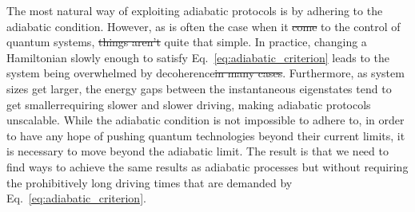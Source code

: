 \documentclass[a4paper,oneside,11pt]{book}
\newcommand{\reminder}[1]{\textcolor{blue}{Reminder: #1}}
\providecommand{\DIFaddtex}[1]{{\protect\color{blue}\uwave{#1}}} %
\providecommand{\DIFdeltex}[1]{{\protect\color{red}\sout{#1}}}                      %
\providecommand{\DIFaddbegin}{} %
\providecommand{\DIFaddend}{} %
\providecommand{\DIFdelbegin}{} %
\providecommand{\DIFdelend}{} %
\providecommand{\DIFadd}[1]{\texorpdfstring{\DIFaddtex{#1}}{#1}} %
\providecommand{\DIFdel}[1]{\texorpdfstring{\DIFdeltex{#1}}{}} %
\newcommand{\DIFscaledelfig}{0.5}
\newlength{\DIFdelgraphicswidth} %
\newlength{\DIFdelgraphicsheight} %
\newcommand{\DIFaddincludegraphics}[2][]{{\color{blue}\fbox{\DIFOincludegraphics[#1]{#2}}}} %
\newcommand{\DIFdelincludegraphics}[2][]{%
\sbox{\DIFdelgraphicsbox}{\DIFOincludegraphics[#1]{#2}}%
\settoboxwidth{\DIFdelgraphicswidth}{\DIFdelgraphicsbox} %
\settoboxtotalheight{\DIFdelgraphicsheight}{\DIFdelgraphicsbox} %
\scalebox{\DIFscaledelfig}{%
\parbox[b]{\DIFdelgraphicswidth}{\usebox{\DIFdelgraphicsbox}\\[-\baselineskip] \rule{\DIFdelgraphicswidth}{0em}}\llap{\resizebox{\DIFdelgraphicswidth}{\DIFdelgraphicsheight}{%
\setlength{\unitlength}{\DIFdelgraphicswidth}%
\begin{picture}(1,1)%
\thicklines\linethickness{2pt} %
{\color[rgb]{1,0,0}\put(0,0){\framebox(1,1){}}}%
{\color[rgb]{1,0,0}\put(0,0){\line( 1,1){1}}}%
{\color[rgb]{1,0,0}\put(0,1){\line(1,-1){1}}}%
\end{picture}%
}\hspace*{3pt}}} %
} %
\DeclareRobustCommand{\DIFaddbegin}{\DIFOaddbegin \let\includegraphics\DIFaddincludegraphics} %
\DeclareRobustCommand{\DIFaddend}{\DIFOaddend \let\includegraphics\DIFOincludegraphics} %
\DeclareRobustCommand{\DIFdelbegin}{\DIFOdelbegin \let\includegraphics\DIFdelincludegraphics} %
\DeclareRobustCommand{\DIFdelend}{\DIFOaddend \let\includegraphics\DIFOincludegraphics} %
\begin{document}
    The most natural way of exploiting adiabatic protocols is by adhering to the adiabatic condition. However, as is often the case when it \DIFdelbegin \DIFdel{come }\DIFdelend \DIFaddbegin \DIFadd{comes }\DIFaddend to the control of quantum systems, \DIFdelbegin \DIFdel{things aren't }\DIFdelend \DIFaddbegin \DIFadd{nothing is }\DIFaddend quite that simple. In practice, changing a Hamiltonian slowly enough to satisfy Eq.~\eqref{eq:adiabatic_criterion} leads to the system being overwhelmed by decoherence\DIFdelbegin \DIFdel{in many cases}\DIFdelend . Furthermore, as system sizes get larger, the energy gaps between the instantaneous eigenstates tend to get smaller\DIFaddbegin \DIFadd{, }\DIFaddend requiring slower and slower driving, making adiabatic protocols unscalable. \DIFaddbegin \DIFadd{\reminder{add citation here} }\DIFaddend While the adiabatic condition is not impossible to adhere to, in order to have any hope of pushing quantum technologies beyond their current limits, it is necessary to move beyond the adiabatic limit. The result is that we need to find ways to achieve the same results as adiabatic processes but without requiring the prohibitively long driving times that are demanded by Eq.~\eqref{eq:adiabatic_criterion}.
\end{document}
